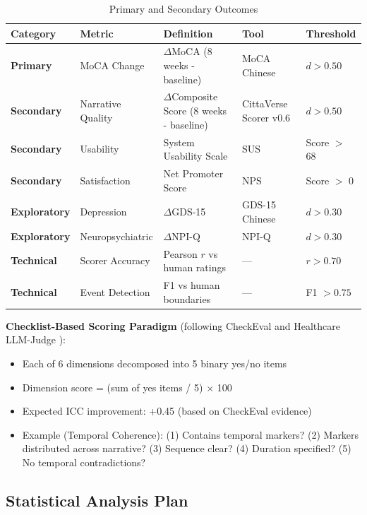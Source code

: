 \documentclass[11pt]{article}
\begin{document}
\begin{table}[h]
\centering
\caption{Primary and Secondary Outcomes}
\label{tab:outcomes}
\begin{tabular}{lllll}
\toprule
\textbf{Category} & \textbf{Metric} & \textbf{Definition} & \textbf{Tool} & \textbf{Threshold} \\
\midrule
\textbf{Primary} & MoCA Change & $\Delta$MoCA (8 weeks - baseline) & MoCA Chinese & $d > 0.50$ \\
\textbf{Secondary} & Narrative Quality & $\Delta$Composite Score (8 weeks - baseline) & CittaVerse Scorer v0.6 & $d > 0.50$ \\
\textbf{Secondary} & Usability & System Usability Scale & SUS & Score $>$ 68 \\
\textbf{Secondary} & Satisfaction & Net Promoter Score & NPS & Score $>$ 0 \\
\textbf{Exploratory} & Depression & $\Delta$GDS-15 & GDS-15 Chinese & $d > 0.30$ \\
\textbf{Exploratory} & Neuropsychiatric & $\Delta$NPI-Q & NPI-Q & $d > 0.30$ \\
\textbf{Technical} & Scorer Accuracy & Pearson $r$ vs human ratings & --- & $r > 0.70$ \\
\textbf{Technical} & Event Detection & F1 vs human boundaries & --- & F1 $> 0.75$ \\
\bottomrule
\end{tabular}
\end{table}

\textbf{Checklist-Based Scoring Paradigm} (following CheckEval \citep{checkeval2024} and Healthcare LLM-Judge \citep{healthcare_llm_judge2025}):
\begin{itemize}
    \item Each of 6 dimensions decomposed into 5 binary yes/no items
    \item Dimension score = (sum of yes items / 5) $\times$ 100
    \item Expected ICC improvement: +0.45 (based on CheckEval evidence)
    \item Example (Temporal Coherence): (1) Contains temporal markers? (2) Markers distributed across narrative? (3) Sequence clear? (4) Duration specified? (5) No temporal contradictions?
\end{itemize}

\subsection{Statistical Analysis Plan}
\end{document}
